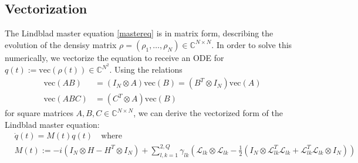 \documentclass[letterpaper]{article}
\newcommand{\Ell}{\mathcal{L}}
\newcommand{\C}{\mathds{C}}
\begin{document}
  \subsection{Vectorization}
  The Lindblad master equation \eqref{mastereq} is in matrix form, describing the evolution of the densisy matrix $\rho = (\rho_1, \dots, \rho_N) \in \C^{N\times N}$. In order to solve this numerically, we vectorize the equation to receive an ODE for $q(t) := \text{vec}(\rho(t)) \in \C^{N^2}$. Using the relations
  \begin{align}
   \text{vec}(AB) &= (I_N\otimes A)\text{vec}(B) = (B^T\otimes I_N)\text{vec}(A) \\
   \text{vec}(ABC) &= (C^T\otimes A)\text{vec}(B)
  \end{align}
  for square matrices $A,B,C\in\C^{N\times N}$, we can derive the vectorized form of the Lindblad master equation:
  \begin{align}\label{mastereq_vectorized}
    &\dot q(t) = M(t) q(t) \quad  \text{where} \\
    &M(t) := -i(I_N\otimes H - H^T \otimes I_N) + \sum_{l,k=1}^{2,Q} \gamma_{lk} \left( \Ell_{lk}\otimes \Ell_{lk} - \frac 1 2 \left( I_N\otimes \Ell^T_{lk}\Ell_{lk} + \Ell^T_{lk}\Ell_{lk} \otimes I_N \right) \right)
  \end{align}
\end{document}

